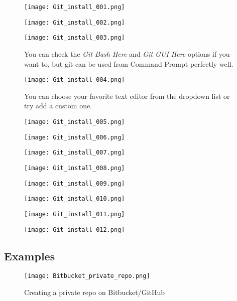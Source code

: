 \begin{appendices}
\begin{figure}[h]
	\centering
	\texttt{[image: Git\_install\_001.png]}
\end{figure}
\begin{figure}[h]
	\centering
	\texttt{[image: Git\_install\_002.png]}
\end{figure}
\begin{figure}[h]
	\centering
	\texttt{[image: Git\_install\_003.png]}
	\caption{You can check the \textit{Git Bash Here} and \textit{Git GUI Here} options if you want to, but git can be used from Command Prompt perfectly well.}
\end{figure}
\begin{figure}[h]
	\centering
	\texttt{[image: Git\_install\_004.png]}
	\caption{You can choose your favorite text editor from the dropdown list or try add a custom one.}
\end{figure}
\begin{figure}[h]
	\centering
	\texttt{[image: Git\_install\_005.png]}
\end{figure}
\begin{figure}[h]
	\centering
	\texttt{[image: Git\_install\_006.png]}
\end{figure}
\begin{figure}[h]
	\centering
	\texttt{[image: Git\_install\_007.png]}
\end{figure}
\begin{figure}[h]
	\centering
	\texttt{[image: Git\_install\_008.png]}
\end{figure}
\begin{figure}[h]
	\centering
	\texttt{[image: Git\_install\_009.png]}
\end{figure}
\begin{figure}[h]
	\centering
	\texttt{[image: Git\_install\_010.png]}
\end{figure}
\begin{figure}[h]
	\centering
	\texttt{[image: Git\_install\_011.png]}
\end{figure}
\begin{figure}[h]
	\centering
	\texttt{[image: Git\_install\_012.png]}
\end{figure}

\FloatBarrier
\subsection{Examples}
\begin{figure}[h]
	\centering
	\texttt{[image: Bitbucket\_private\_repo.png]}
	\caption{Creating a private repo on Bitbucket/GitHub}
\end{figure}


\end{appendices}
